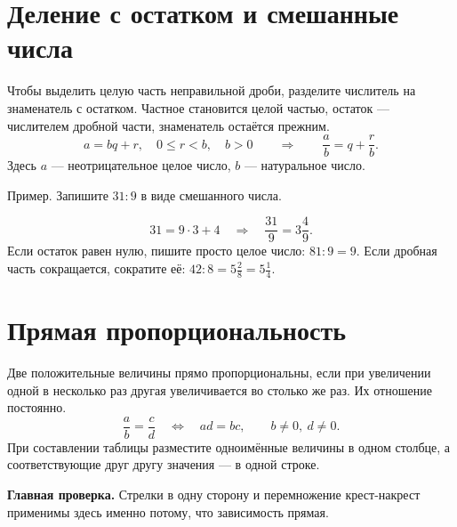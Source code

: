 \documentclass[a4paper,12pt]{article}
\newcommand{\idea}[1]{\textcolor{darkaccent}{\textbf{#1}}}
\newcommand{\ex}[1]{\par\medskip\textcolor{darkaccent}{#1}\par\smallskip}
\begin{document}
\section{Деление с остатком и смешанные числа}
Чтобы выделить целую часть неправильной дроби, разделите числитель на знаменатель с остатком. Частное становится целой частью, остаток --- числителем дробной части, знаменатель остаётся прежним.
\[
a=bq+r,\quad 0\le r<b,\quad b>0
\qquad\Longrightarrow\qquad
\frac ab=q+\frac rb.
\]
Здесь $a$ --- неотрицательное целое число, $b$ --- натуральное число.
\ex{Пример. Запишите $31:9$ в виде смешанного числа.}
\[
31=9\cdot3+4\quad\Longrightarrow\quad \frac{31}{9}=3\frac49.
\]
Если остаток равен нулю, пишите просто целое число: $81:9=9$. Если дробная часть сокращается, сократите её: $42:8=5\frac28=5\frac14$.
\section{Прямая пропорциональность}
Две положительные величины прямо пропорциональны, если при увеличении одной в несколько раз другая увеличивается во столько же раз. Их отношение постоянно.
\[
\frac ab=\frac cd\quad\Longleftrightarrow\quad ad=bc,\qquad b\ne0,\ d\ne0.
\]
При составлении таблицы разместите одноимённые величины в одном столбце, а соответствующие друг другу значения --- в одной строке.
\begin{center}
\end{center}
\idea{Главная проверка.} Стрелки в одну сторону и перемножение крест-накрест применимы здесь именно потому, что зависимость прямая.
\clearpage
\end{document}
